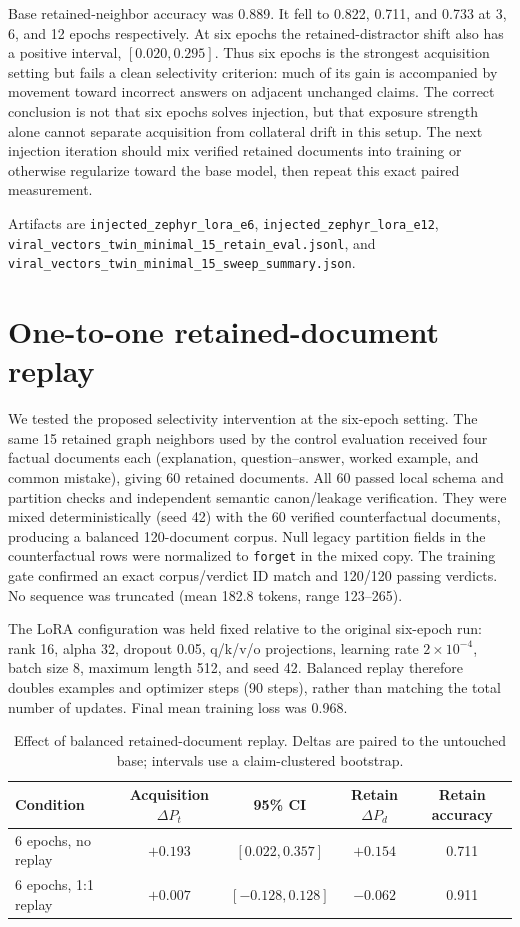 \documentclass[11pt]{article}
\begin{document}
Base retained-neighbor accuracy was 0.889. It fell to 0.822, 0.711, and 0.733
at 3, 6, and 12 epochs respectively. At six epochs the retained-distractor shift
also has a positive interval, $[0.020,0.295]$. Thus six epochs is the strongest
acquisition setting but fails a clean selectivity criterion: much of its gain is
accompanied by movement toward incorrect answers on adjacent unchanged claims.
The correct conclusion is not that six epochs solves injection, but that exposure
strength alone cannot separate acquisition from collateral drift in this setup.
The next injection iteration should mix verified retained documents into training
or otherwise regularize toward the base model, then repeat this exact paired
measurement.

Artifacts are \texttt{injected\_zephyr\_lora\_e6},
\texttt{injected\_zephyr\_lora\_e12},
\texttt{viral\_vectors\_twin\_minimal\_15\_retain\_eval.jsonl}, and
\texttt{viral\_vectors\_twin\_minimal\_15\_sweep\_summary.json}.

\section{One-to-one retained-document replay}

We tested the proposed selectivity intervention at the six-epoch setting. The
same 15 retained graph neighbors used by the control evaluation received four
factual documents each (explanation, question--answer, worked example, and
common mistake), giving 60 retained documents. All 60 passed local schema and
partition checks and independent semantic canon/leakage verification. They were
mixed deterministically (seed 42) with the 60 verified counterfactual documents,
producing a balanced 120-document corpus. Null legacy partition fields in the
counterfactual rows were normalized to \texttt{forget} in the mixed copy. The
training gate confirmed an exact corpus/verdict ID match and 120/120 passing
verdicts. No sequence was truncated (mean 182.8 tokens, range 123--265).

The LoRA configuration was held fixed relative to the original six-epoch run:
rank 16, alpha 32, dropout 0.05, q/k/v/o projections, learning rate
$2\times10^{-4}$, batch size 8, maximum length 512, and seed 42. Balanced replay
therefore doubles examples and optimizer steps (90 steps), rather than matching
the total number of updates. Final mean training loss was 0.968.

\begin{table}[h]
\centering
\begin{tabular}{lcccc}
\toprule
Condition & Acquisition $\Delta P_t$ & 95\% CI & Retain $\Delta P_d$ & Retain accuracy \\
\midrule
6 epochs, no replay & $+0.193$ & $[0.022,0.357]$ & $+0.154$ & 0.711 \\
6 epochs, 1:1 replay & $+0.007$ & $[-0.128,0.128]$ & $-0.062$ & 0.911 \\
\bottomrule
\end{tabular}
\caption{Effect of balanced retained-document replay. Deltas are paired to the
untouched base; intervals use a claim-clustered bootstrap.}
\end{table}
\end{document}
